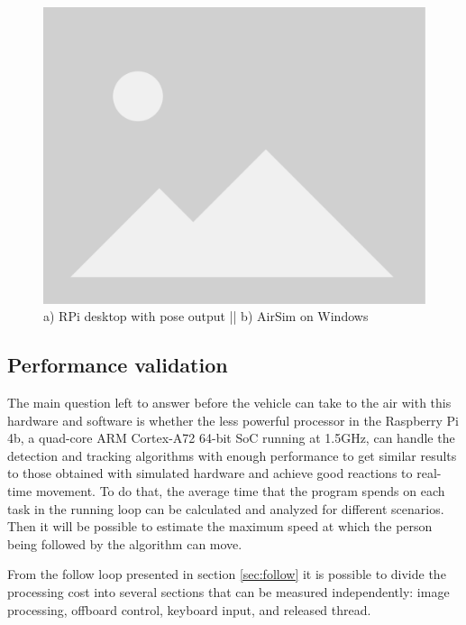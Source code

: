 \begin{figure}
  \centering
  \includegraphics[width=.8\textwidth, keepaspectratio]{img/placeholder.png}
  \caption{a) RPi desktop with pose output || b) AirSim on Windows}
  \label{fig:rpi-airsim-test}
\end{figure}

\subsection{Performance validation}
\label{subsec:performance}

The main question left to answer before the vehicle can take to the air with this hardware and software is whether the less powerful processor in the Raspberry Pi 4b, a quad-core ARM Cortex-A72 64-bit SoC running at 1.5GHz, can handle the detection and tracking algorithms with enough performance to get similar results to those obtained with simulated hardware and achieve good reactions to real-time movement.
To do that, the average time that the program spends on each task in the running loop can be calculated and analyzed for different scenarios.
Then it will be possible to estimate the maximum speed at which the person being followed by the algorithm can move.

From the follow loop presented in section \ref{sec:follow} it is possible to divide the processing cost into several sections that can be measured independently: image processing, offboard control, keyboard input, and released thread.

